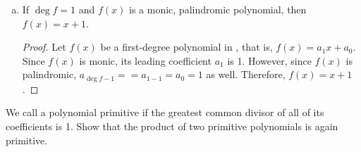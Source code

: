 \documentclass{agony}
\begin{document}
\begin{enumerate}[(a)]
\begin{proof}
          It follows that each term cancels its palindromic term, and the resulting sum is 0.
        \end{proof}
  \item If $\deg f = 1$ and $f(x)$ is a monic, palindromic polynomial, then $f(x) = x+1$.
        \begin{proof}
          Let $f(x)$ be a first-degree polynomial in \C, that is, $f(x) = a_1x + a_0$.
          Since $f(x)$ is monic, its leading coefficient $a_1$ is 1.
          However, since $f(x)$ is palindromic, $a_{\deg f - 1} = = a_{1-1} = a_0 = 1$ as well.
          Therefore, $f(x) = x + 1$.
        \end{proof}
\end{enumerate}



\question We call a polynomial primitive if the greatest common divisor of all of its coefficients is 1.
Show that the product of two primitive polynomials is again primitive.
\end{document}
